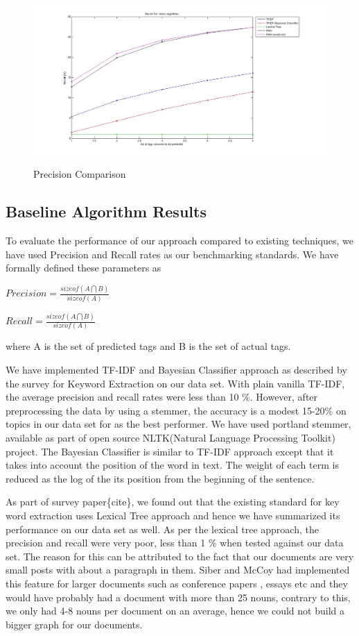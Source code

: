 \documentclass[dvips,12pt]{article}
\begin{document}
		\begin{figure}
			\centering
			\caption{Precision Comparison}
			\includegraphics[scale=0.3]{../baseline/recall.jpg}
            \label{recall}
		\end{figure}
		\subsection{Baseline Algorithm Results}
		
		
		To evaluate the performance of our approach compared to existing techniques, we have used Precision and Recall rates as our benchmarking standards.
		We have formally defined these parameters as 
		
		$Precision = \frac{ sizeof(A \bigcap B)}{sizeof(A)}$
		
		$Recall    = \frac{ sizeof(A \bigcap B)}{sizeof(A)}$
		
		where A is the set of predicted tags and B is the set of actual tags.
		
		We have implemented TF-IDF and Bayesian Classifier approach as described by the survey for Keyword Extraction on our data set. With plain vanilla TF-IDF, the average precision and recall rates were less than 10 \%. However, after preprocessing the data by using a stemmer, the accuracy is a modest 15-20\% on topics in our data set for as the best performer.
		We have used portland stemmer, available as part of open source NLTK(Natural Language Processing Toolkit) project.
		The Bayesian Classifier is similar to TF-IDF approach except that it takes into account the position of the word in text. The weight of each term is reduced as the log of the its position from the beginning of the sentence.
		
				
		As part of survey paper\{cite\}, we found out that the existing standard for key word extraction uses Lexical Tree approach and hence we have summarized its performance on our data set as well. As per the lexical tree approach, the precision and recall were very poor, less than 1 \% when tested against our data set. The reason for this can be attributed to the fact that our documents are very small posts with about a paragraph in them. Siber and McCoy\cite{silber2002efficiently} had implemented this feature for larger documents such as conference papers , essays etc and they would have probably had a document with more than 25 nouns, contrary to this, we only had 4-8 nouns per document on an average, hence we could not build a bigger graph for our documents. 
		
\end{document}
